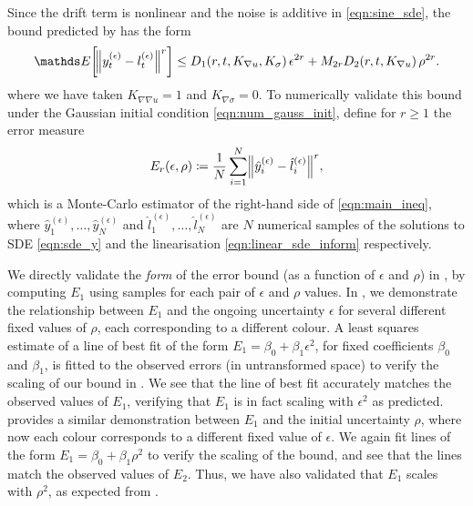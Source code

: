 Since the drift term is nonlinear and the noise is additive in \cref{eqn:sine_sde}, the bound predicted by  has the form
\[
	\avg{\norm{y_t^{(\epsilon)} - l_t^{(\epsilon)}}^r} \leq D_1\!\left(r,t, K_{\nabla u}, K_\sigma\right)\epsilon^{2r} + M_{2r}D_2\!\left(r,t, K_{\nabla u}\right)\rho^{2r}.
\]
where we have taken \(K_{\nabla\nabla u} = 1\) and \(K_{\nabla\sigma} = 0\).
To numerically validate this bound under the Gaussian initial condition \cref{eqn:num_gauss_init}, define for \(r \geq 1\) the error measure
\begin{equation}
	E_r\!\left(\epsilon, \rho\right) \coloneqq \frac{1}{N}\sum_{i=1}^N{\norm{\hat{y}_{i}^{(\epsilon)} - \hat{l}_i^{(\epsilon)}}^r},
	\label{eqn:strong_err_mc_estimate}
\end{equation}
which is a Monte-Carlo estimator of the right-hand side of \cref{eqn:main_ineq}, where \(\hat{y}_1^{(\epsilon)},\dotsc, \hat{y}_N^{(\epsilon)}\) and \(\hat{l}_1^{(\epsilon)},\dotsc, \hat{l}_N^{(\epsilon)}\) are \(N\) numerical samples of the solutions to SDE \cref{eqn:sde_y} and the linearisation \cref{eqn:linear_sde_inform} respectively.

We directly validate the \emph{form} of the error bound (as a function of \(\epsilon\) and \(\rho\)) in , by computing \(E_1\) using samples for each pair of \(\epsilon\) and \(\rho\) values.
In , we demonstrate the relationship between \(E_1\) and the ongoing uncertainty \(\epsilon\) for several different fixed values of \(\rho\), each corresponding to a different colour.
A least squares estimate of a line of best fit of the form \(E_1 = \beta_0 + \beta_1 \epsilon^2 \), for fixed coefficients \(\beta_0\) and \(\beta_1\), is fitted to the observed errors (in untransformed space) to verify the scaling of our bound in .
We see that the line of best fit accurately matches the observed values of \(E_1\), verifying that \(E_1\) is in fact scaling with \(\epsilon^2\) as predicted.
 provides a similar demonstration between \(E_1\) and the initial uncertainty \(\rho\), where now each colour corresponds to a different fixed value of \(\epsilon\).
We again fit lines of the form \(E_1 = \beta_0 + \beta_1 \rho^2\) to verify the scaling of the bound, and see that the lines match the observed values of \(E_2\).
Thus, we have also validated that \(E_1\) scales with \(\rho^2\), as expected from .

